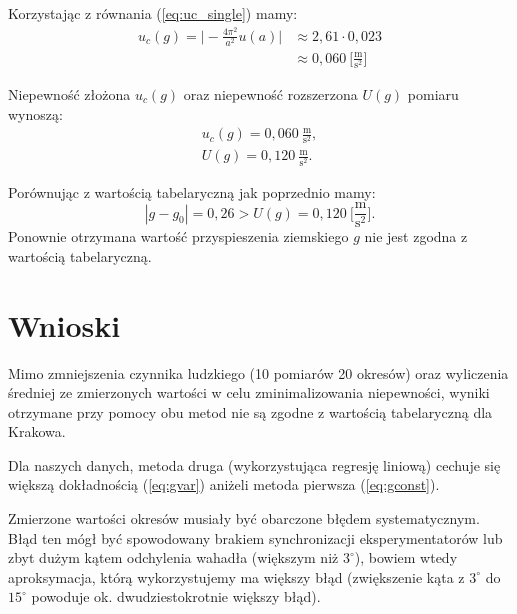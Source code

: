 \documentclass[12pt,a4paper]{article}
\numberwithin{equation}{section}
\begin{document}
Korzystając z równania (\ref{eq:uc_single}) mamy:
\begin{equation}
	\begin{split}
	u_c(g) = \Big|-\frac{4\pi^2}{a^2}u(a)\Big| & \approx 2,61 \cdot 0,023\\
		   & \approx 0,060~\Big[\frac{\textrm{m}}{\textrm{s}^2}\Big]
	\end{split}
\end{equation}

Niepewność złożona $u_c(g)$ oraz niepewność rozszerzona $U(g)$ pomiaru wynoszą:
\begin{align}
	u_c(g) = 0,060~\frac{\textrm{m}}{\textrm{s}^2}, \\
	U(g) = 0,120~\frac{\textrm{m}}{\textrm{s}^2}.
\end{align}

Porównując z wartością tabelaryczną jak poprzednio mamy:
\begin{equation}
	|g - g_0| = 0,26 > U(g) = 0,120~\Big[\frac{\textrm{m}}{\textrm{s}^2}\Big].
	\label{eq:gvar}
\end{equation}
Ponownie otrzymana wartość przyspieszenia ziemskiego $g$ nie jest zgodna z wartością tabelaryczną.
\section{Wnioski}
Mimo zmniejszenia czynnika ludzkiego (10 pomiarów 20 okresów) oraz wyliczenia średniej ze zmierzonych wartości w celu zminimalizowania niepewności, wyniki otrzymane przy pomocy obu metod nie są zgodne z wartością tabelaryczną dla Krakowa.

Dla naszych danych, metoda druga (wykorzystująca regresję liniową) cechuje się większą dokładnością (\ref{eq:gvar}) aniżeli metoda pierwsza (\ref{eq:gconst}).

Zmierzone wartości okresów musiały być obarczone błędem systematycznym. Błąd ten mógł być spowodowany brakiem synchronizacji eksperymentatorów lub zbyt dużym kątem odchylenia wahadła (większym niż $3^\circ$), bowiem wtedy aproksymacja, którą wykorzystujemy ma większy błąd (zwiększenie kąta z $3^\circ$ do $15^\circ$ powoduje ok. dwudziestokrotnie większy błąd).


\end{document}
